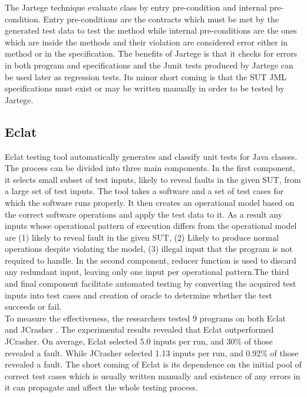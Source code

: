 \noindent The Jartege technique evaluate class by entry pre-condition and internal pre-condition. Entry pre-conditions are the contracts which must be met by the generated test data to test the method while internal pre-conditions are the ones which are inside the methods and their violation are considered error either in method or in the specification. The benefits of Jartege is that it checks for errors in both program and specifications and the Junit tests produced by Jartege can be used later as regression tests. Its minor short coming is that the SUT JML specifications must exist or may be written manually in order to be tested by Jartege.

\subsection{Eclat}
Eclat \cite{Pacheco2005} testing tool automatically generates and classify unit tests for Java classes. The process can be divided into three main components. In the first component, it selects small subset of test inputs, likely to reveal faults in the given SUT, from a large set of test inputs. The tool takes a software and a set of test cases for which the software runs properly. It then creates an operational model based on the correct software operations and apply the test data to it. As a result any inputs whose operational pattern of execution differs from the operational model are (1) likely to reveal fault in the given SUT, (2) Likely to produce normal operations despite violating the model, (3) illegal input that the program is not required to handle. In the second component, reducer function is used to discard any redundant input, leaving only one input per operational pattern.The third and final component facilitate automated testing by converting the acquired test inputs into test cases and creation of oracle to determine whether the test succeeds or fail. \\
\indent To measure the effectiveness, the researchers tested 9 programs on both Eclat and JCrasher \cite{Pacheco2007b}.  The experimental results revealed that Eclat outperformed JCrasher. On average, Eclat selected 5.0 inputs per run, and 30\% of those revealed a fault. While JCrasher selected 1.13 inputs per run, and 0.92\% of those revealed a fault. The short coming of Eclat is its dependence on the initial pool of correct test cases which is usually written manually and existence of any errors in it can propagate and affect the whole testing process.    
